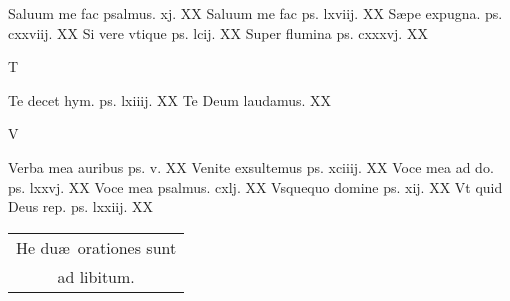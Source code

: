 \documentclass[a5paper,10pt]{book}
\def\ae{æ}
\begin{document}
\begin{multicols}{2}
\vspace{-.75em}
\par \noindent Saluum me fac psalmus. xj. \hfill XX
\newline Saluum me fac ps. lxviij. \hfill XX
\newline S\ae pe expugna. ps. cxxviij. \hfill XX
\newline Si vere vtique ps. lcij. \hfill XX
\newline Super flumina ps. cxxxvj. \hfill XX
\newline \vspace{-1.75em}
\begin{center}
\color{red} T
\end{center}
\vspace{-.75em}
\par \noindent Te decet hym. ps. lxiiij. \hfill XX
\newline Te Deum laudamus. \hfill XX
\newline \vspace{-1.75em}
\begin{center}
\color{red} V
\end{center}
\vspace{-.75em}
\par \noindent Verba mea auribus ps. v. \hfill XX
\newline Venite exsultemus ps. xciiij. \hfill XX%
\newline Voce mea ad do. ps. lxxvj. \hfill XX
\newline Voce mea psalmus. cxlj. \hfill XX
\newline Vsquequo domine ps. xij. \hfill XX
\newline Vt quid Deus rep. ps. lxxiij. \hfill XX
\begin{center}
\begin{tabular}{l r}
\multicolumn{2}{c}{He du\ae \ orationes sunt}\\
\multicolumn{2}{c}{ad libitum.}
\end{tabular}
\end{center}
\end{multicols}
\end{document}
